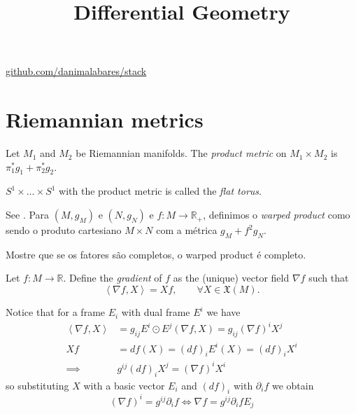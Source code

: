 



\title{Differential Geometry}
\maketitle

\label{section-phantom}
\hfill
\href{http://github.com/danimalabares/stack}{github.com/danimalabares/stack}
\tableofcontents

\section{Riemannian metrics}
\label{section-Riemannian-metrics}

\begin{definition}
\label{definition-product-metric}
Let $M_1$ and $M_2$ be Riemannian manifolds. The {\it product metric} on
$M_1\times M_2$ is $\pi_1^*g_1+\pi_2^*g_2$.
\end{definition}

\begin{definition}
\label{definition-flat-torus}
$S^1\times\ldots\times S^1$ with the product metric is called the {\it flat
torus}.
\end{definition}

\begin{exercise}
\label{exercise-wraped-product}
See \cite{pet}. Para $(M,g_M)$ e $(N,g_N)$ e $f:M \to \mathbb{R}_+$, definimos o
 {\it warped product} como sendo o produto cartesiano $M\times N$ com a métrica 
 $g_M+f^2g_N$.

Mostre que se os fatores são completos, o warped product é completo.
\end{exercise}

\begin{definition}
\label{definition-gradient}
Let  $f:M\to\mathbb{R}$. Define the {\it gradient} of $f$ as the (unique) vector
field $\nabla f$ such that
\begin{equation}
\label{equation-gradient}
\left<\nabla f,X\right>=Xf, \qquad \forall X\in\mathfrak{X}(M).
\end{equation}
\end{definition}

Notice that for a frame $E_i$ with dual frame $E^i$ we have
\begin{align*}
\left<\nabla f,X\right>&=g_{ij}E^i\odot E^j(\nabla f,X)
=g_{ij}(\nabla f)^iX^j\\
Xf&=df(X)=(df)_iE^i(X)=(df)_iX^i\\
\implies& g^{ij}(df)_iX^j=(\nabla f)^iX^i
\end{align*}
so substituting $X$ with a basic vector $E_i$ and $(df)_i$ with $\partial_if$ we
obtain
\begin{equation}
\label{equation-gradient-in-coordinates}
(\nabla f)^i=g^{ij}\partial_if \iff \nabla f=g^{ij}\partial_ifE_j
\end{equation}

